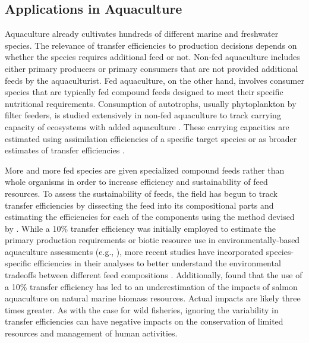 \documentclass[oneside,12pt,final]{sty/ucthesis-CA2012}
\let\cite\citep                             %
\begin{document}
\begin{mainmatter}
\subsection{Applications in Aquaculture}
Aquaculture already cultivates hundreds of different marine and freshwater species. The relevance of transfer efficiencies to production decisions depends on whether the species requires additional feed or not. Non-fed aquaculture includes either primary producers or primary consumers that are not provided additional feeds by the aquaculturist. Fed aquaculture, on the other hand, involves consumer species that are typically fed compound feeds designed to meet their specific nutritional requirements. Consumption of autotrophs, usually phytoplankton by filter feeders, is studied extensively in non-fed aquaculture to track carrying capacity of ecosystems with added aquaculture \cite{banas2007tidal}. These carrying capacities are estimated using assimilation efficiencies of a specific target species \cite{rosland2009applying, irisarri2013absorption, srisunont2016estimating} or as broader estimates of transfer efficiencies \cite{simenstad1995influence, sommer1998algal, byron2011calculating, han2017evaluating}.

\vspace{5mm}

More and more fed species are given specialized compound feeds rather than whole organisms in order to increase efficiency and sustainability of feed resources. To assess the sustainability of feeds, the field has begun to track transfer efficiencies by dissecting the feed into its compositional parts and estimating the efficiencies for each of the components using the method devised by \citet{pauly1995primary}. While a 10\% transfer efficiency was initially employed to estimate the primary production requirements or biotic resource use in environmentally-based aquaculture assessments (e.g., \citealt{papatryphon2004environmental, pelletier2007feeding, pelletier2009not}), more recent studies have incorporated species-specific efficiencies in their analyses to better understand the environmental tradeoffs between different feed compositions \cite{cashion2016review}. Additionally, \citet{cashion2016review} found that the use of a 10\% transfer efficiency has led to an underestimation of the impacts of salmon aquaculture on natural marine biomass resources. Actual impacts are likely three times greater. As with the case for wild fisheries, ignoring the variability in transfer efficiencies can have negative impacts on the conservation of limited resources and management of human activities.


\end{mainmatter}
\end{document}
